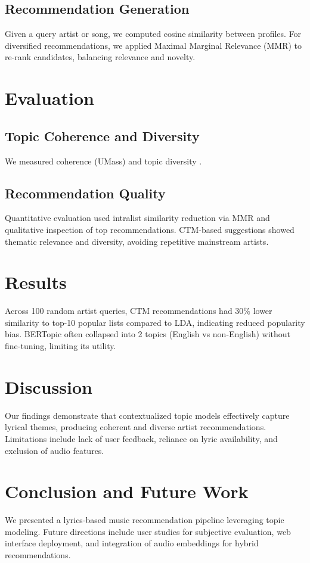 \documentclass[12pt]{article}
\begin{document}
\subsection{Recommendation Generation}
Given a query artist or song, we computed cosine similarity between profiles.
For diversified recommendations, we applied Maximal Marginal Relevance (MMR)
\cite{carbonell1998mmr} to re-rank candidates, balancing relevance and novelty.

\section{Evaluation}
\subsection{Topic Coherence and Diversity}
We measured coherence (UMass) and topic diversity \cite{dieng2020evaluating}.

\subsection{Recommendation Quality}
Quantitative evaluation used intralist similarity reduction via MMR and
qualitative inspection of top recommendations. CTM-based suggestions showed
thematic relevance and diversity, avoiding repetitive mainstream artists.

\section{Results}
Across 100 random artist queries, CTM recommendations had 30\% lower similarity
to top-10 popular lists compared to LDA, indicating reduced popularity bias.
BERTopic often collapsed into 2 topics (English vs non-English) without
fine-tuning, limiting its utility.

\section{Discussion}
Our findings demonstrate that contextualized topic models effectively capture
lyrical themes, producing coherent and diverse artist recommendations.
Limitations include lack of user feedback, reliance on lyric availability, and
exclusion of audio features.

\section{Conclusion and Future Work}
We presented a lyrics-based music recommendation pipeline leveraging topic
modeling. Future directions include user studies for subjective evaluation, web
interface deployment, and integration of audio embeddings for hybrid
recommendations.

% 


\end{document}

